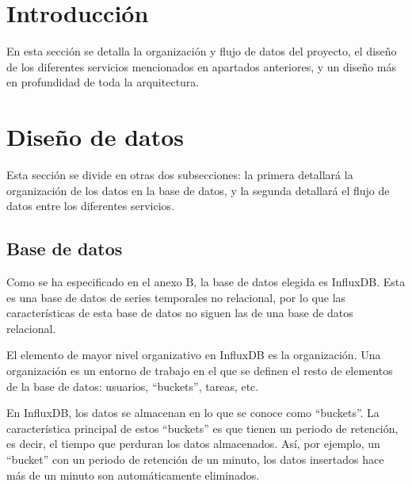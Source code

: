 
\section{Introducción}

En esta sección se detalla la organización y flujo de datos del proyecto, el diseño de los diferentes 
servicios mencionados en apartados anteriores, y un diseño más en profundidad de toda la arquitectura.

\section{Diseño de datos}

Esta sección se divide en otras dos subsecciones: la primera detallará la organización de los datos 
en la base de datos, y la segunda detallará el flujo de datos entre los diferentes servicios.

\subsection*{Base de datos}

Como se ha especificado en el anexo B, la base de datos elegida es InfluxDB. Esta es una base de datos 
de series temporales no relacional, por lo que las características de esta base de datos no siguen 
las de una base de datos relacional.

El elemento de mayor nivel organizativo en InfluxDB es la organización. Una organización es un 
entorno de trabajo en el que se definen el resto de elementos de la base de datos: usuarios, ``buckets'',
tareas, etc.

En InfluxDB, los datos se almacenan en lo que se conoce como ``buckets''. La característica principal
de estos ``buckets'' es que tienen un periodo de retención, es decir, el tiempo que perduran los datos
almacenados. Así, por ejemplo, un ``bucket'' con un periodo de retención de un minuto, los datos insertados
hace más de un minuto son automáticamente eliminados. 

